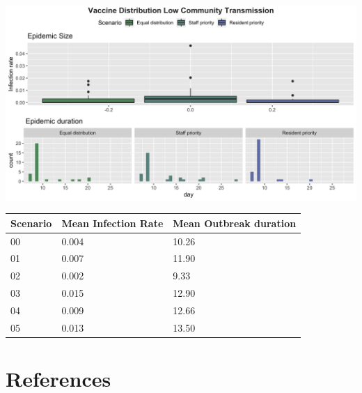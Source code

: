 \documentclass[
]{article}
\begin{document}
\includegraphics{Figures/Scenarios/VD_Low}

\begin{longtable}[]{@{}lll@{}}
\toprule
Scenario & Mean Infection Rate & Mean Outbreak duration\tabularnewline
\midrule
\endhead
00 & 0.004 & 10.26\tabularnewline
01 & 0.007 & 11.90\tabularnewline
02 & 0.002 & 9.33\tabularnewline
03 & 0.015 & 12.90\tabularnewline
04 & 0.009 & 12.66\tabularnewline
05 & 0.013 & 13.50\tabularnewline
\bottomrule
\end{longtable}

\hypertarget{references}{%
\section*{References}\label{references}}
\end{document}
